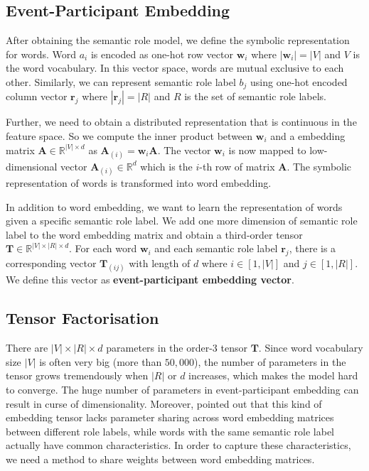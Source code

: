 \documentclass[a4paper]{article}
\begin{document}
\subsection{Event-Participant Embedding} \label{sec:epe}
After obtaining the semantic role model, we define the symbolic representation for words. Word $a_i$ is encoded as one-hot row vector $\mathbf{w}_i$ where $|\mathbf{w}_i| = |V|$ and $V$ is the word vocabulary. In this vector space, words are mutual exclusive to each other. Similarly, we can represent semantic role label $b_j$ using one-hot encoded column vector $\mathbf{r}_j$ where $|\mathbf{r}_j| = |R|$ and $R$ is the set of semantic role labels. 

Further, we need to obtain a distributed representation that is continuous in the feature space. So we compute the inner product between $\mathbf{w}_i$ and a embedding matrix $\mathbf{A} \in \mathbb{R}^{|V| \times d}$ as $\mathbf{A}_{(i)} = \mathbf{w}_i \mathbf{A}$. The vector $\mathbf{w}_i$ is now mapped to low-dimensional vector $\mathbf{A}_{(i)} \in \mathbb{R}^d$ which is the $i$-th row of matrix $\mathbf{A}$. The symbolic representation of words is transformed into word embedding. 

In addition to word embedding, we want to learn the representation of words given a specific semantic role label. We add one more dimension of semantic role label to the word embedding matrix and obtain a third-order tensor $\mathbf{T} \in \mathbb{R}^{|V| \times |R| \times d}$. For each word $\mathbf{w}_i$ and each semantic role label $\mathbf{r}_j$, there is a corresponding vector $\mathbf{T}_{(ij)}$ with length of $d$ where $i \in [1, |V|]$ and $j \in [1, |R|]$. We define this vector as \textbf{event-participant embedding vector}. 


\subsection{Tensor Factorisation} \label{sec:tf}
There are $|V| \times |R| \times d$ parameters in the order-3 tensor $\mathbf{T}$. Since word vocabulary size $|V|$ is often very big (more than $50,000$), the number of parameters in the tensor grows tremendously when $|R|$ or $d$ increases, which makes the model hard to converge. The huge number of parameters in event-participant embedding can result in curse of dimensionality. Moreover, \citep{tilk2016event} pointed out that this kind of embedding tensor lacks parameter sharing across word embedding matrices between different role labels, while words with the same semantic role label actually have common characteristics. In order to capture these characteristics, we need a method to share weights between word embedding matrices. 
\end{document}
